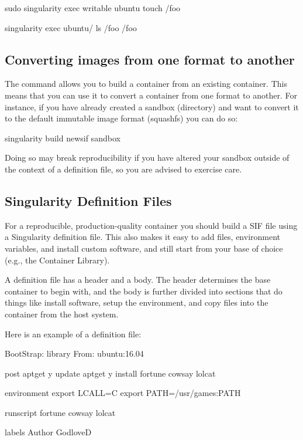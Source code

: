 \documentclass[letterpaper,10pt,english]{sphinxmanual}
\begin{document}
%
\begin{sphinxVerbatim}[commandchars=\\\{\}]
\PYGZdl{} sudo singularity exec \PYGZhy{}\PYGZhy{}writable ubuntu touch /foo

\PYGZdl{} singularity exec ubuntu/ ls /foo
/foo
\end{sphinxVerbatim}


\subsection{Converting images from one format to another}
\label{\detokenize{quick_start:converting-images-from-one-format-to-another}}
The  command allows you to build a container from an existing
container. This means that you can use it to convert a container from one format
to another. For instance, if you have already created a sandbox (directory) and
want to convert it to the default immutable image format (squashfs) you can do
so:

%
\begin{sphinxVerbatim}[commandchars=\\\{\}]
\PYGZdl{} singularity build new\PYGZhy{}sif sandbox
\end{sphinxVerbatim}

Doing so may break reproducibility if you have altered your sandbox outside of
the context of a definition file, so you are advised to exercise care.


\subsection{Singularity Definition Files}
\label{\detokenize{quick_start:singularity-definition-files}}
For a reproducible, production-quality container you should build a SIF file
using a Singularity definition file. This also makes it easy to add files,
environment variables, and install custom software, and still start from your
base of choice (e.g., the Container Library).

A definition file has a header and a body. The header determines the base
container to begin with, and the body is further divided into sections that do
things like install software, setup the environment, and copy files into the
container from the host system.

Here is an example of a definition file:

%
\begin{sphinxVerbatim}[commandchars=\\\{\}]
BootStrap: library
From: ubuntu:16.04

\PYGZpc{}post
    apt\PYGZhy{}get \PYGZhy{}y update
    apt\PYGZhy{}get \PYGZhy{}y install fortune cowsay lolcat

\PYGZpc{}environment
    export LC\PYGZus{}ALL=C
    export PATH=/usr/games:\PYGZdl{}PATH

\PYGZpc{}runscript
    fortune \textbar{} cowsay \textbar{} lolcat

\PYGZpc{}labels
    Author GodloveD
\end{sphinxVerbatim}
\end{document}
